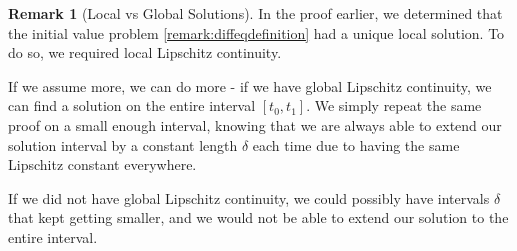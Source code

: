 \documentclass[prb,12pt]{revtex4-2}
\theoremstyle{definition}
\newtheorem{Remark}[Theorem]{Remark}
\theoremstyle{definition}
\theoremstyle{definition}
\begin{document}
\begin{Remark}[Local vs Global Solutions]
	In the proof earlier, we determined that the initial value problem \ref{remark:diffeqdefinition} had a unique local solution. To do so, we required local Lipschitz continuity.
	
	If we assume more, we can do more - if we have global Lipschitz continuity, we can find a solution on the entire interval $[t_0, t_1]$. We simply repeat the same proof on a small enough interval, knowing that we are always able to extend our solution interval by a constant length $\delta$ each time due to having the same Lipschitz constant everywhere.
	
	If we did not have global Lipschitz continuity, we could possibly have intervals $\delta$ that kept getting smaller, and we would not be able to extend our solution to the entire interval.
\end{Remark}
\end{document}
